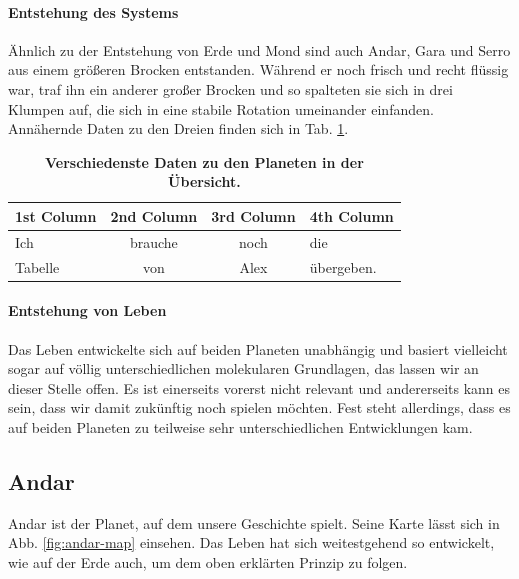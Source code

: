 \paragraph{Entstehung des Systems} 
Ähnlich zu der Entstehung von Erde und Mond sind auch Andar, Gara und Serro aus einem größeren Brocken entstanden.
Während er noch frisch und recht flüssig war, traf ihn ein anderer großer Brocken und so spalteten sie sich in drei Klumpen auf, die sich in eine stabile Rotation umeinander einfanden.
Annähernde Daten zu den Dreien finden sich in Tab. \ref{tab:planetendaten}.

\begin{table}[htb]
	\centering
	\caption[Planetendaten]{\textbf{Verschiedenste Daten zu den Planeten in der Übersicht.}}
	\label{tab:planetendaten}
	\begin{threeparttable}
		\begin{tabularx}{\textwidth}{l|ccX} %
			\toprule
			\textbf{1st Column} & \textbf{2nd Column} & \textbf{3rd Column} & \textbf{4th Column} \\ 
			\midrule
			Ich   &        brauche             &        noch             & die \\
			Tabelle   &       von              &          Alex           & übergeben. \\ 
			\bottomrule
		\end{tabularx}
	\end{threeparttable}
\end{table}

\paragraph{Entstehung von Leben}
Das Leben entwickelte sich auf beiden Planeten unabhängig und basiert vielleicht sogar auf völlig unterschiedlichen molekularen Grundlagen, das lassen wir an dieser Stelle offen.
Es ist einerseits vorerst nicht relevant und andererseits kann es sein, dass wir damit zukünftig noch spielen möchten.
Fest steht allerdings, dass es auf beiden Planeten zu teilweise sehr unterschiedlichen Entwicklungen kam. 


\subsection{Andar} \label{sec:planet}
Andar ist der Planet, auf dem unsere Geschichte spielt.
Seine Karte lässt sich in Abb. \ref{fig:andar-map} einsehen.
Das Leben hat sich weitestgehend so entwickelt, wie auf der Erde auch, um dem oben erklärten Prinzip zu folgen.


